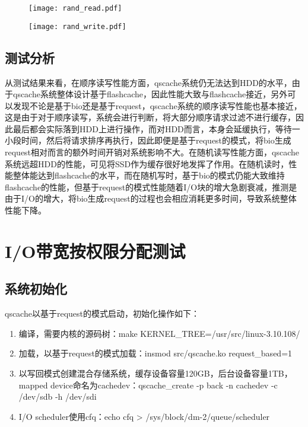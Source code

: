 \begin{figure}[!htbp]
    \centering
    \texttt{[image: rand\_read.pdf]}
\end{figure}

\begin{figure}[!htbp]
    \centering
    \texttt{[image: rand\_write.pdf]}
\end{figure}

\subsection{测试分析}

从测试结果来看，在顺序读写性能方面，qscache系统仍无法达到HDD的水平，由于qscache系统整体设计基于flashcache，因此性能大致与flashcache接近，另外可以发现不论是基于bio还是基于request，qscache系统的顺序读写性能也基本接近，这是由于对于顺序读写，系统会进行判断，将大部分顺序请求过滤不进行缓存，因此最后都会实际落到HDD上进行操作，而对HDD而言，本身会延缓执行，等待一小段时间，然后将请求排序再执行，因此即便是基于request的模式，将bio生成request相对而言的额外时间开销对系统影响不大。在随机读写性能方面，qscache系统远超HDD的性能，可见将SSD作为缓存很好地发挥了作用。在随机读时，性能整体能达到flashcache的水平，而在随机写时，基于bio的模式仍能大致维持flashcache的性能，但基于request的模式性能随着I/O块的增大急剧衰减，推测是由于I/O的增大，将bio生成request的过程也会相应消耗更多时间，导致系统整体性能下降。

\section{I/O带宽按权限分配测试}

\subsection{系统初始化}
qscache以基于request的模式启动，初始化操作如下：
\begin{enumerate}
    \item 编译，需要内核的源码树：make KERNEL\_TREE=/usr/src/linux-3.10.108/
    \item 加载，以基于request的模式加载：insmod src/qscache.ko request\_based=1
    \item 以写回模式创建混合存储系统，缓存设备容量120GB，后台设备容量1TB，mapped device命名为cachedev：qscache\_create -p back -n cachedev -c /dev/sdb -h /dev/sdi
    \item I/O scheduler使用cfq：echo cfq > /sys/block/dm-2/queue/scheduler
\end{enumerate}

